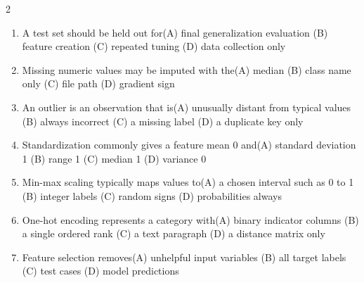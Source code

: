 \documentclass[a4paper]{article}
\begin{document}
\begin{multicols*}{2}
\begin{enumerate}
\item A test set should be held out for\newline\hspace*{0.6em}(A) final generalization evaluation \quad (B) feature creation \newline\hspace*{0.6em}(C) repeated tuning \quad (D) data collection only
\item Missing numeric values may be imputed with the\newline\hspace*{0.6em}(A) median \quad (B) class name only \newline\hspace*{0.6em}(C) file path \quad (D) gradient sign
\item An outlier is an observation that is\newline\hspace*{0.6em}(A) unusually distant from typical values \quad (B) always incorrect \newline\hspace*{0.6em}(C) a missing label \quad (D) a duplicate key only
\item Standardization commonly gives a feature mean 0 and\newline\hspace*{0.6em}(A) standard deviation 1 \quad (B) range 1 \newline\hspace*{0.6em}(C) median 1 \quad (D) variance 0
\item Min-max scaling typically maps values to\newline\hspace*{0.6em}(A) a chosen interval such as 0 to 1 \quad (B) integer labels \newline\hspace*{0.6em}(C) random signs \quad (D) probabilities always
\item One-hot encoding represents a category with\newline\hspace*{0.6em}(A) binary indicator columns \quad (B) a single ordered rank \newline\hspace*{0.6em}(C) a text paragraph \quad (D) a distance matrix only
\item Feature selection removes\newline\hspace*{0.6em}(A) unhelpful input variables \quad (B) all target labels \newline\hspace*{0.6em}(C) test cases \quad (D) model predictions

\end{enumerate}
\end{multicols*}
\end{document}
